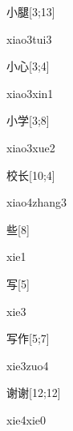 \begin{verbete}{小腿}[3;13]
\begin{pronuncia}{xiao3tui3}
\end{pronuncia}
\end{verbete}

\begin{verbete}{小心}[3;4]
\begin{pronuncia}{xiao3xin1}
\end{pronuncia}
\end{verbete}

\begin{verbete}{小学}[3;8]
\begin{pronuncia}{xiao3xue2}
\end{pronuncia}
\end{verbete}

\begin{verbete}{校长}[10;4]
\begin{pronuncia}{xiao4zhang3}
\end{pronuncia}
\end{verbete}

\begin{verbete}[xie1]{些}[8]
\begin{pronuncia}{xie1}
\end{pronuncia}
\end{verbete}

\begin{verbete}[xie3]{写}[5]
\begin{pronuncia}{xie3}
\end{pronuncia}
\end{verbete}

\begin{verbete}{写作}[5;7]
\begin{pronuncia}{xie3zuo4}
\end{pronuncia}
\end{verbete}

\begin{verbete}{谢谢}[12;12]
\begin{pronuncia}{xie4xie0}
\end{pronuncia}
\end{verbete}


